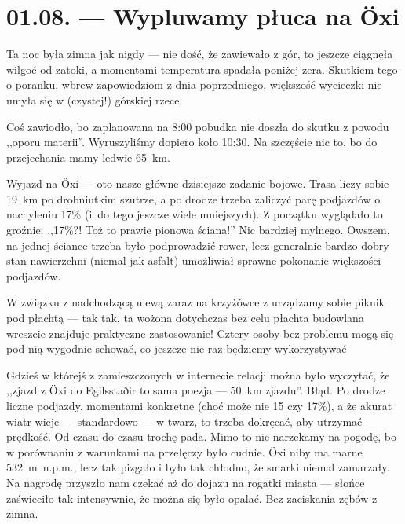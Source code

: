 \chapter*{01.08. --- Wypluwamy płuca na Öxi}

Ta noc była zimna jak nigdy --- nie dość, że zawiewało z gór, to jeszcze ciągnęła wilgoć od zatoki, a momentami temperatura spadała poniżej zera. Skutkiem tego o poranku, wbrew zapowiedziom z dnia poprzedniego, większość wycieczki nie umyła się w (czystej!) górskiej rzece \wink


Coś zawiodło, bo zaplanowana na 8:00 pobudka nie doszła do skutku z powodu ,,oporu materii''. Wyruszyliśmy dopiero koło 10:30. Na szczęście nic to, bo do przejechania mamy ledwie 65~km.

Wyjazd na Öxi --- oto nasze główne dzisiejsze zadanie bojowe. Trasa liczy sobie 19~km po drobniutkim szutrze, a po drodze trzeba zaliczyć parę podjazdów o nachyleniu 17\% (i~do tego jeszcze wiele mniejszych). Z początku wyglądało to groźnie: ,,17\%?! Toż to prawie pionowa ściana!'' Nic bardziej mylnego. Owszem, na jednej ściance trzeba było podprowadzić rower, lecz generalnie bardzo dobry stan nawierzchni (niemal jak asfalt) umożliwiał sprawne pokonanie większości podjazdów.


\pagebreak

W związku z nadchodzącą ulewą zaraz na krzyżówce z  urządzamy sobie piknik pod płachtą --- tak tak, ta wożona dotychczas bez celu płachta budowlana wreszcie znajduje praktyczne zastosowanie! Cztery osoby bez problemu mogą się pod nią wygodnie schować, co jeszcze nie raz będziemy wykorzystywać\textellipsis

Gdzieś w którejś z zamieszczonych w internecie relacji można było wyczytać, że ,,zjazd z Öxi do Egilsstaðir to sama poezja --- 50~km zjazdu''. Błąd. Po drodze liczne podjazdy, momentami konkretne (choć może nie 15 czy 17\%), a że akurat wiatr wieje --- standardowo --- w twarz, to trzeba dokręcać, aby utrzymać prędkość. Od czasu do czasu trochę pada. Mimo to nie narzekamy na pogodę, bo w porównaniu z warunkami na przełęczy było cudnie. Öxi niby ma marne 532~m~n.p.m., lecz tak pizgało i było tak chłodno, że smarki niemal zamarzały. Na nagrodę przyszło nam czekać aż do dojazu na rogatki miasta --- słońce zaświeciło tak intensywnie, że można się było opalać. Bez zaciskania zębów z zimna.

